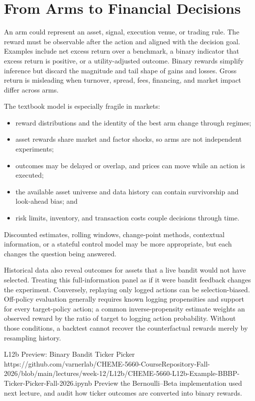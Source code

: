 \documentclass[11pt]{article}
\begin{document}
\section{From Arms to Financial Decisions}

An arm could represent an asset, signal, execution venue, or trading rule. The reward must be observable after the action and aligned with the decision goal. Examples include net excess return over a benchmark, a binary indicator that excess return is positive, or a utility-adjusted outcome. Binary rewards simplify inference but discard the magnitude and tail shape of gains and losses. Gross return is misleading when turnover, spread, fees, financing, and market impact differ across arms.

The textbook model is especially fragile in markets:
\begin{itemize}[leftmargin=1.3em,itemsep=2pt,topsep=2pt]
  \item reward distributions and the identity of the best arm change through regimes;
  \item asset rewards share market and factor shocks, so arms are not independent experiments;
  \item outcomes may be delayed or overlap, and prices can move while an action is executed;
  \item the available asset universe and data history can contain survivorship and look-ahead bias; and
  \item risk limits, inventory, and transaction costs couple decisions through time.
\end{itemize}
Discounted estimates, rolling windows, change-point methods, contextual information, or a stateful control model may be more appropriate, but each changes the question being answered.

Historical data also reveal outcomes for assets that a live bandit would not have selected. Treating this full-information panel as if it were bandit feedback changes the experiment. Conversely, replaying only logged actions can be selection-biased. Off-policy evaluation generally requires known logging propensities and support for every target-policy action; a common inverse-propensity estimate weights an observed reward by the ratio of target to logging action probability. Without those conditions, a backtest cannot recover the counterfactual rewards merely by resampling history.

\notebooklink
  {L12b Preview: Binary Bandit Ticker Picker}
  {https://github.com/varnerlab/CHEME-5660-CourseRepository-Fall-2026/blob/main/lectures/week-12/L12b/CHEME-5660-L12b-Example-BBBP-Ticker-Picker-Fall-2026.ipynb}
  {Preview the Bernoulli--Beta implementation used next lecture, and audit how ticker outcomes are converted into binary rewards.}
\end{document}
